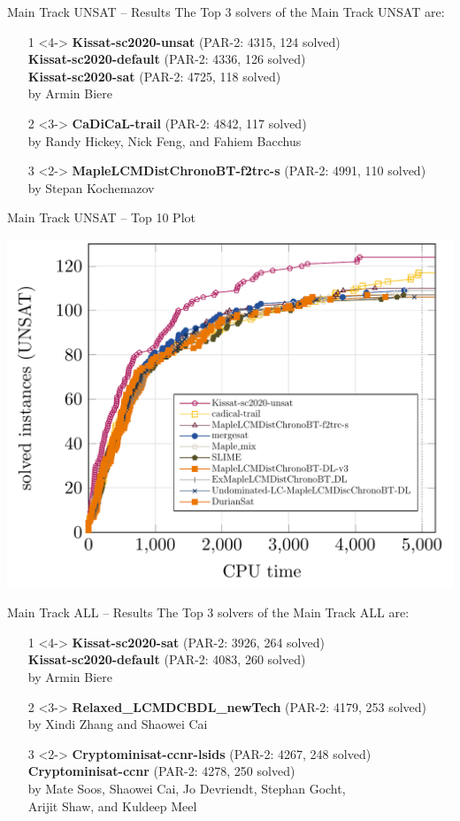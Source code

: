 \documentclass{beamer}
\begin{document}
\begin{frame}{Main Track UNSAT -- Results}
The Top 3 solvers of the Main Track UNSAT are:
\begin{itemize}
\item[1]<4-> 
{\bf Kissat-sc2020-unsat}  (PAR-2: 4315, 124 solved)\\
{\bf Kissat-sc2020-default}  (PAR-2: 4336, 126 solved)\\
{\bf Kissat-sc2020-sat} (PAR-2: 4725, 118 solved)\\
by Armin Biere
\item[2]<3-> {\bf CaDiCaL-trail} (PAR-2: 4842, 117 solved)\\
by Randy Hickey, Nick Feng, and Fahiem Bacchus
\item[3]<2-> {\bf MapleLCMDistChronoBT-f2trc-s} (PAR-2: 4991, 110 solved)  \\
by Stepan Kochemazov
\end{itemize}
\end{frame}


\begin{frame}{Main Track UNSAT -- Top 10 Plot}

\centering
\includegraphics[width=.8\textwidth]{main-top10-UNSAT}

\end{frame}

\begin{frame}{Main Track ALL -- Results}
The Top 3 solvers of the Main Track ALL are:
\begin{itemize}
\item[1]<4-> {\bf Kissat-sc2020-sat} (PAR-2: 3926, 264 solved)\\
{\bf Kissat-sc2020-default}  (PAR-2: 4083, 260 solved)\\
by Armin Biere
\item[2]<3-> {\bf Relaxed\_LCMDCBDL\_newTech} (PAR-2: 4179, 253 solved)  \\
by Xindi Zhang and Shaowei Cai
\item[3]<2-> {\bf Cryptominisat-ccnr-lsids} (PAR-2: 4267, 248 solved)\\
{\bf Cryptominisat-ccnr} (PAR-2: 4278, 250 solved)\\
by Mate Soos, Shaowei Cai, Jo Devriendt, Stephan Gocht,\\Arijit Shaw, and  Kuldeep Meel
\end{itemize}
\end{frame}
\end{document}
